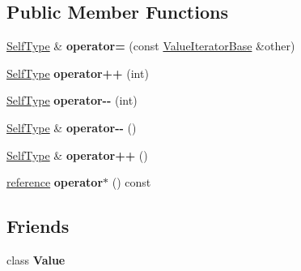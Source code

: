 \subsection*{Public Member Functions}
\begin{DoxyCompactItemize}
\item 
\hypertarget{class_json_1_1_value_const_iterator_ade307721f874f4474d1565753ce76523}{\hyperlink{class_json_1_1_value_iterator_base}{Self\+Type} \& {\bfseries operator=} (const \hyperlink{class_json_1_1_value_iterator_base}{Value\+Iterator\+Base} \&other)}\label{class_json_1_1_value_const_iterator_ade307721f874f4474d1565753ce76523}

\item 
\hypertarget{class_json_1_1_value_const_iterator_ab3f0c2edbfc8f7d60645f3d597d05e28}{\hyperlink{class_json_1_1_value_iterator_base}{Self\+Type} {\bfseries operator++} (int)}\label{class_json_1_1_value_const_iterator_ab3f0c2edbfc8f7d60645f3d597d05e28}

\item 
\hypertarget{class_json_1_1_value_const_iterator_a94935961e9331c6f7b907b05ec8df75e}{\hyperlink{class_json_1_1_value_iterator_base}{Self\+Type} {\bfseries operator-\/-\/} (int)}\label{class_json_1_1_value_const_iterator_a94935961e9331c6f7b907b05ec8df75e}

\item 
\hypertarget{class_json_1_1_value_const_iterator_a31415e44e44e56fb2bfda7e8bb784646}{\hyperlink{class_json_1_1_value_iterator_base}{Self\+Type} \& {\bfseries operator-\/-\/} ()}\label{class_json_1_1_value_const_iterator_a31415e44e44e56fb2bfda7e8bb784646}

\item 
\hypertarget{class_json_1_1_value_const_iterator_a2cfe2f7a94a688186efdafb1b181c319}{\hyperlink{class_json_1_1_value_iterator_base}{Self\+Type} \& {\bfseries operator++} ()}\label{class_json_1_1_value_const_iterator_a2cfe2f7a94a688186efdafb1b181c319}

\item 
\hypertarget{class_json_1_1_value_const_iterator_aeb44153d71c61ac9397a84d5ecc244c5}{\hyperlink{class_json_1_1_value}{reference} {\bfseries operator$\ast$} () const }\label{class_json_1_1_value_const_iterator_aeb44153d71c61ac9397a84d5ecc244c5}

\end{DoxyCompactItemize}
\subsection*{Friends}
\begin{DoxyCompactItemize}
\item 
\hypertarget{class_json_1_1_value_const_iterator_aeceedf6e1a7d48a588516ce2b1983d6f}{class {\bfseries Value}}\label{class_json_1_1_value_const_iterator_aeceedf6e1a7d48a588516ce2b1983d6f}

\end{DoxyCompactItemize}
